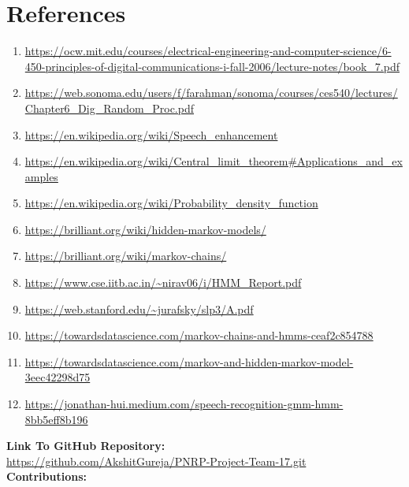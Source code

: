 \documentclass[10pt,twocolumn,letterpaper]{article}
\newcommand\blankpage{%
    \null
    \thispagestyle{empty}%
    \addtocounter{page}{-1}%
    \newpage}
\begin{document}
\section{References}
\begin{enumerate}
    \item 
    \url{https://ocw.mit.edu/courses/electrical-engineering-and-computer-science/6-450-principles-of-digital-communications-i-fall-2006/lecture-notes/book_7.pdf}
    \item 
    \url{https://web.sonoma.edu/users/f/farahman/sonoma/courses/ces540/lectures/Chapter6_Dig_Random_Proc.pdf}
    \item \url{https://en.wikipedia.org/wiki/Speech_enhancement}
    \item \url{https://en.wikipedia.org/wiki/Central_limit_theorem#Applications_and_examples}
    \item \url{https://en.wikipedia.org/wiki/Probability_density_function}
    \item \url{https://brilliant.org/wiki/hidden-markov-models/}
    \item \url{https://brilliant.org/wiki/markov-chains/}
    \item \url{https://www.cse.iitb.ac.in/~nirav06/i/HMM_Report.pdf}
    \item \url{https://web.stanford.edu/~jurafsky/slp3/A.pdf}
    \item \url{https://towardsdatascience.com/markov-chains-and-hmms-ceaf2c854788}
    \item \url{https://towardsdatascience.com/markov-and-hidden-markov-model-3eec42298d75}
    \item \url{https://jonathan-hui.medium.com/speech-recognition-gmm-hmm-8bb5eff8b196}
    
\end{enumerate}
\newpage
\pagebreak
\afterpage{\blankpage}
\afterpage{\blankpage}
\textbf{\Large Link To GitHub Repository:}\\
\url{https://github.com/AkshitGureja/PNRP-Project-Team-17.git}\\
\newline
\textbf{\Large Contributions:}
\end{document}
